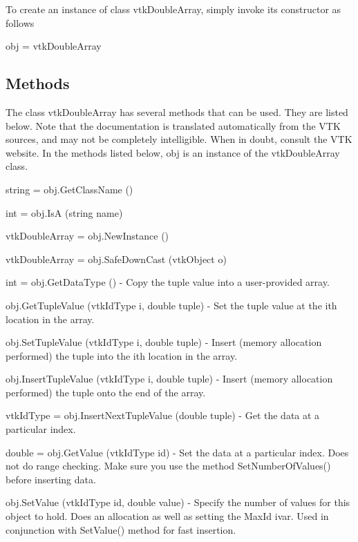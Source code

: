 To create an instance of class vtk\-Double\-Array, simply invoke its constructor as follows \begin{DoxyVerb}  obj = vtkDoubleArray
\end{DoxyVerb}
 \hypertarget{vtkwidgets_vtkxyplotwidget_Methods}{}\subsection{Methods}\label{vtkwidgets_vtkxyplotwidget_Methods}
The class vtk\-Double\-Array has several methods that can be used. They are listed below. Note that the documentation is translated automatically from the V\-T\-K sources, and may not be completely intelligible. When in doubt, consult the V\-T\-K website. In the methods listed below, {\ttfamily obj} is an instance of the vtk\-Double\-Array class. 
\begin{DoxyItemize}
\item {\ttfamily string = obj.\-Get\-Class\-Name ()}  
\item {\ttfamily int = obj.\-Is\-A (string name)}  
\item {\ttfamily vtk\-Double\-Array = obj.\-New\-Instance ()}  
\item {\ttfamily vtk\-Double\-Array = obj.\-Safe\-Down\-Cast (vtk\-Object o)}  
\item {\ttfamily int = obj.\-Get\-Data\-Type ()} -\/ Copy the tuple value into a user-\/provided array.  
\item {\ttfamily obj.\-Get\-Tuple\-Value (vtk\-Id\-Type i, double tuple)} -\/ Set the tuple value at the ith location in the array.  
\item {\ttfamily obj.\-Set\-Tuple\-Value (vtk\-Id\-Type i, double tuple)} -\/ Insert (memory allocation performed) the tuple into the ith location in the array.  
\item {\ttfamily obj.\-Insert\-Tuple\-Value (vtk\-Id\-Type i, double tuple)} -\/ Insert (memory allocation performed) the tuple onto the end of the array.  
\item {\ttfamily vtk\-Id\-Type = obj.\-Insert\-Next\-Tuple\-Value (double tuple)} -\/ Get the data at a particular index.  
\item {\ttfamily double = obj.\-Get\-Value (vtk\-Id\-Type id)} -\/ Set the data at a particular index. Does not do range checking. Make sure you use the method Set\-Number\-Of\-Values() before inserting data.  
\item {\ttfamily obj.\-Set\-Value (vtk\-Id\-Type id, double value)} -\/ Specify the number of values for this object to hold. Does an allocation as well as setting the Max\-Id ivar. Used in conjunction with Set\-Value() method for fast insertion.  

\end{DoxyItemize}
